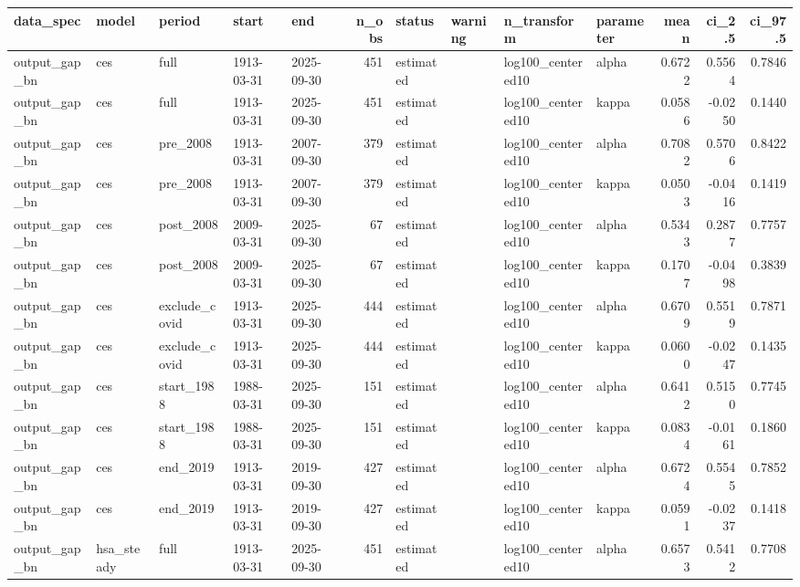 \begin{tabular}{lllllrllllrrr}
\toprule
data\_spec & model & period & start & end & n\_obs & status & warning & n\_transform & parameter & mean & ci\_2.5 & ci\_97.5 \\
\midrule
output\_gap\_bn & ces & full & 1913-03-31 & 2025-09-30 & 451 & estimated &  & log100\_centered10 & alpha & 0.6722 & 0.5564 & 0.7846 \\
output\_gap\_bn & ces & full & 1913-03-31 & 2025-09-30 & 451 & estimated &  & log100\_centered10 & kappa & 0.0586 & -0.0250 & 0.1440 \\
output\_gap\_bn & ces & pre\_2008 & 1913-03-31 & 2007-09-30 & 379 & estimated &  & log100\_centered10 & alpha & 0.7082 & 0.5706 & 0.8422 \\
output\_gap\_bn & ces & pre\_2008 & 1913-03-31 & 2007-09-30 & 379 & estimated &  & log100\_centered10 & kappa & 0.0503 & -0.0416 & 0.1419 \\
output\_gap\_bn & ces & post\_2008 & 2009-03-31 & 2025-09-30 & 67 & estimated &  & log100\_centered10 & alpha & 0.5343 & 0.2877 & 0.7757 \\
output\_gap\_bn & ces & post\_2008 & 2009-03-31 & 2025-09-30 & 67 & estimated &  & log100\_centered10 & kappa & 0.1707 & -0.0498 & 0.3839 \\
output\_gap\_bn & ces & exclude\_covid & 1913-03-31 & 2025-09-30 & 444 & estimated &  & log100\_centered10 & alpha & 0.6709 & 0.5519 & 0.7871 \\
output\_gap\_bn & ces & exclude\_covid & 1913-03-31 & 2025-09-30 & 444 & estimated &  & log100\_centered10 & kappa & 0.0600 & -0.0247 & 0.1435 \\
output\_gap\_bn & ces & start\_1988 & 1988-03-31 & 2025-09-30 & 151 & estimated &  & log100\_centered10 & alpha & 0.6412 & 0.5150 & 0.7745 \\
output\_gap\_bn & ces & start\_1988 & 1988-03-31 & 2025-09-30 & 151 & estimated &  & log100\_centered10 & kappa & 0.0834 & -0.0161 & 0.1860 \\
output\_gap\_bn & ces & end\_2019 & 1913-03-31 & 2019-09-30 & 427 & estimated &  & log100\_centered10 & alpha & 0.6724 & 0.5545 & 0.7852 \\
output\_gap\_bn & ces & end\_2019 & 1913-03-31 & 2019-09-30 & 427 & estimated &  & log100\_centered10 & kappa & 0.0591 & -0.0237 & 0.1418 \\
output\_gap\_bn & hsa\_steady & full & 1913-03-31 & 2025-09-30 & 451 & estimated &  & log100\_centered10 & alpha & 0.6573 & 0.5412 & 0.7708 \\

\end{tabular}
